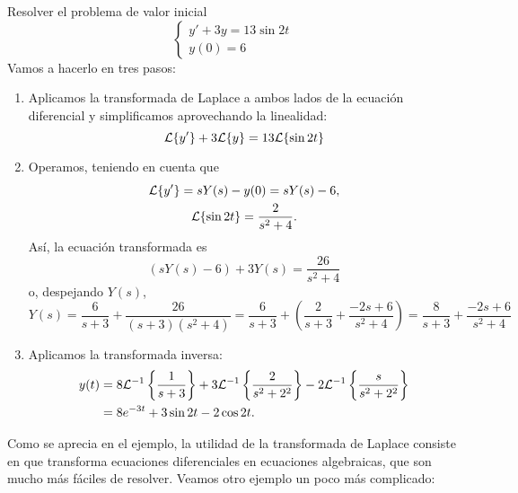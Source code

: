 \documentclass[../ecuaciones_diferenciales.tex]{subfiles}
\begin{document}
\begin{example}
	Resolver el problema de valor inicial
	\[
		\begin{cases}
			y' + 3y = 13 \sin 2t \\
			y(0) = 6
		\end{cases}
	\]
	Vamos a hacerlo en tres pasos:
	\begin{enumerate}[1)]
		\item Aplicamos la transformada de Laplace a ambos lados de la ecuación
		      diferencial y simplificamos aprovechando la linealidad:
		      \[\mathcal{L}\{y'\} + 3\mathcal{L}\{y\} = 13\mathcal{L}\{\sin 2t\}\]
		\item Operamos, teniendo en cuenta que
		      \begin{gather*}
			      \mathcal{L}\{y'\} = sY(s) - y(0) = sY(s) -  6, \\
			      \mathcal{L}\{\sin 2t\} = \frac{2}{s^2+4}.
		      \end{gather*}
		      Así, la ecuación transformada es
		      \[(sY(s) - 6) + 3Y(s) = \frac{26}{s^2+4}\]
		      o, despejando \(Y(s)\),
		      \[
			      Y(s) = \frac{6}{s+3} + \frac{26}{(s+3)(s^2+4)} = \frac{6}{s+3} + \left(
			      \frac{2}{s+3} + \frac{-2s+6}{s^2+4} \right) = \frac{8}{s+3} + \frac{-2s+6}{s^2+4}
		      \]
		\item Aplicamos la transformada inversa:
		      \begin{align*}
			      y(t) & = 8 \mathcal{L}^{-1}\left\{\frac{1}{s+3}\right\} + 3
			      \mathcal{L}^{-1}\left\{\frac{2}{s^2+2^2}\right\} -2
			      \mathcal{L}^{-1}\left\{\frac{s}{s^2+2^2}\right\}            \\
			           & = 8e^{-3t} + 3\sin 2t - 2\cos 2t.
		      \end{align*}
	\end{enumerate}
\end{example}

Como se aprecia en el ejemplo, la utilidad de la transformada de Laplace consiste
en que transforma ecuaciones diferenciales en ecuaciones algebraicas, que son
mucho más fáciles de resolver. Veamos otro ejemplo un poco más complicado:
\end{document}
